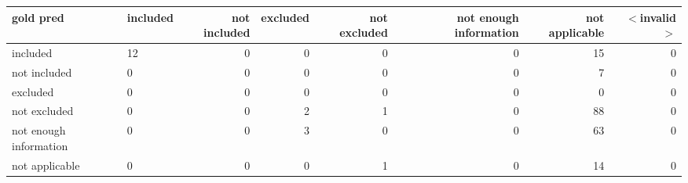 \begin{tabular}{llrrrrrr}
\toprule
gold  pred & included & not included & excluded & not excluded & not enough information & not applicable & $<$invalid$>$ \\
\midrule
included & 12 & 0 & 0 & 0 & 0 & 15 & 0 \\
not included & 0 & 0 & 0 & 0 & 0 & 7 & 0 \\
excluded & 0 & 0 & 0 & 0 & 0 & 0 & 0 \\
not excluded & 0 & 0 & 2 & 1 & 0 & 88 & 0 \\
not enough information & 0 & 0 & 3 & 0 & 0 & 63 & 0 \\
not applicable & 0 & 0 & 0 & 1 & 0 & 14 & 0 \\
\bottomrule
\end{tabular}
